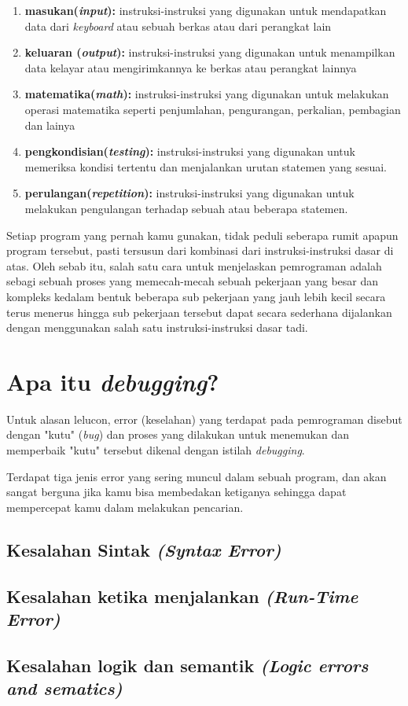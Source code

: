 \begin{enumerate}
	\item \textbf{masukan(\textit{input}):} instruksi-instruksi yang digunakan untuk mendapatkan data dari \textit{keyboard} atau sebuah berkas atau dari perangkat lain
	\item \textbf{keluaran (\textit{output}):} instruksi-instruksi yang digunakan untuk menampilkan data kelayar atau mengirimkannya ke berkas atau perangkat lainnya
	\item \textbf{matematika(\textit{math}): }instruksi-instruksi yang digunakan untuk melakukan operasi matematika seperti penjumlahan, pengurangan, perkalian, pembagian dan lainya
	\item \textbf{pengkondisian(\textit{testing}):} instruksi-instruksi yang digunakan untuk memeriksa kondisi tertentu dan menjalankan urutan statemen yang sesuai.
	\item \textbf{perulangan(\textit{repetition}):} instruksi-instruksi yang digunakan untuk melakukan pengulangan terhadap sebuah atau beberapa statemen.
\end{enumerate}

Setiap program yang pernah kamu gunakan, tidak peduli seberapa rumit apapun program tersebut, pasti tersusun dari kombinasi dari instruksi-instruksi dasar di atas. Oleh sebab itu, salah satu cara untuk menjelaskan pemrograman adalah sebagi sebuah proses yang memecah-mecah sebuah pekerjaan yang besar dan kompleks kedalam bentuk beberapa sub pekerjaan yang jauh lebih kecil secara terus menerus hingga sub pekerjaan tersebut dapat secara sederhana dijalankan dengan menggunakan salah satu instruksi-instruksi dasar tadi.

\section{Apa itu \textit{debugging}?}

Untuk alasan lelucon, error (keselahan) yang terdapat pada pemrograman disebut dengan "kutu" (\textit{bug}) dan proses yang dilakukan untuk menemukan dan memperbaik "kutu" tersebut dikenal dengan istilah \textit{debugging}.

Terdapat tiga jenis error yang sering muncul dalam sebuah program, dan akan sangat berguna jika kamu bisa membedakan ketiganya sehingga dapat mempercepat kamu dalam melakukan pencarian.

\subsection{Kesalahan Sintak \textit{(Syntax Error)}}
\subsection{Kesalahan ketika menjalankan \textit{(Run-Time Error)}}
\subsection{Kesalahan logik dan semantik \textit{(Logic errors and sematics)}}